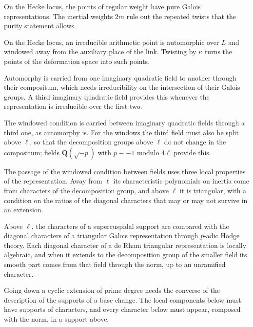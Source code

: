 On the Hecke locus, the points of regular weight have pure Galois representations. The inertial weights $2m$ rule out the repeated twists that the purity statement allows.

On the Hecke locus, an irreducible arithmetic point is automorphic over $L$ and windowed away from the auxiliary place of the link. Twisting by $\kappa$ turns the points of the deformation space into such points.

Automorphy is carried from one imaginary quadratic field to another through their compositum, which needs irreducibility on the intersection of their Galois groups. A third imaginary quadratic field provides this whenever the representation is irreducible over the first two.

The windowed condition is carried between imaginary quadratic fields through a third one, as automorphy is. For the windows the third field must also be split above $\ell$, so that the decomposition groups above $\ell$ do not change in the compositum; fields $\mathbf Q(\sqrt{-p})$ with $p\equiv-1$ modulo $4\ell$ provide this.

The passage of the windowed condition between fields uses three local properties of the representation. Away from $\ell$ its characteristic polynomials on inertia come from characters of the decomposition group, and above $\ell$ it is triangular, with a condition on the ratios of the diagonal characters that may or may not survive in an extension.

Above $\ell$, the characters of a supercuspidal support are compared with the diagonal characters of a triangular Galois representation through $p$-adic Hodge theory. Each diagonal character of a de Rham triangular representation is locally algebraic, and when it extends to the decomposition group of the smaller field its smooth part comes from that field through the norm, up to an unramified character.

Going down a cyclic extension of prime degree needs the converse of the description of the supports of a base change. The local components below must have supports of characters, and every character below must appear, composed with the norm, in a support above.

